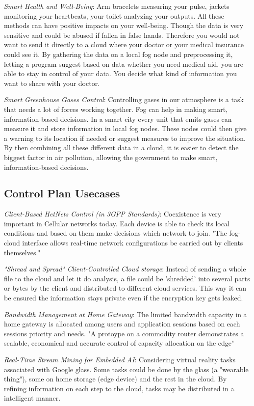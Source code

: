 \textit{Smart Health and Well-Being}: Arm bracelets measuring your pulse, jackets monitoring your heartbeats, your toilet analyzing your outputs. All these methods can have positive impacts on your well-being. Though the data is very sensitive and could be abused if fallen in false hands. Therefore you would not want to send it directly to a cloud where your doctor or your medical insurance could see it. By gathering the data on a local fog node and preprocessing it, letting a program suggest based on data whether you need medical aid, you are able to stay in control of your data. You decide what kind of information you want to share with your doctor.

\textit{Smart Greenhouse Gases Control}: Controlling gases in our atmosphere is a task that needs a lot of forces working together. Fog can help in making smart, information-based decisions. In a smart city every unit that emits gases can measure it and store information in local fog nodes. These nodes could then give a warning to its location if needed or suggest measures to improve the situation. By then combining all these different data in a cloud, it is easier to detect the biggest factor in air pollution, allowing the government to make smart, information-based decisions.
\subsection{Control Plan Usecases}

\textit{Client-Based HetNets Control (in 3GPP Standards)}: Coexistence is very important in Cellular networks today. Each device is able to check its local conditions and based on them make decisions which network to join. "The fog-cloud interface allows real-time network configurations be carried out by clients themselves."\cite[p. 860]{DBLP:journals/iotj/ChiangZ16}

\textit{"Shread and Spread" Client-Controlled Cloud storage}: Instead of sending a whole file to the cloud and let it do analysis, a file could be 'shredded' into several parts or bytes by the client and distributed to different cloud services. This way it can be ensured the information stays private even if the encryption key gets leaked.\cite[p. 861]{DBLP:journals/iotj/ChiangZ16}

\textit{Bandwidth Management at Home Gateway}: The limited bandwidth capacity in a home gateway is allocated among users and application sessions based on each sessions priority and needs. "A protoype on a commodity router demonstrates a scalable, economical and accurate control of capacity allocation on the edge"\cite[p. 861]{DBLP:journals/iotj/ChiangZ16}

\textit{Real-Time Stream Mining for Embedded AI}: Considering virtual reality tasks associated with Google glass. Some tasks could be done by the glass (a "wearable thing"), some on home storage (edge device) and the rest in the cloud. By refining information on each step to the cloud, tasks may be distributed in a intelligent manner.\cite[p. 861]{DBLP:journals/iotj/ChiangZ16}
